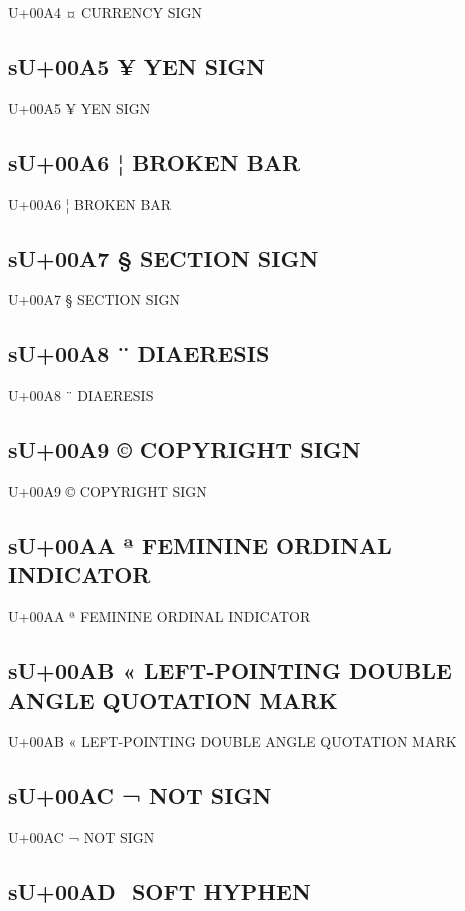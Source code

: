 U+00A4 ¤  CURRENCY SIGN

\subsection{sU+00A5 ¥  YEN SIGN}

U+00A5 ¥  YEN SIGN

\subsection{sU+00A6 ¦  BROKEN BAR}

U+00A6 ¦  BROKEN BAR

\subsection{sU+00A7 §  SECTION SIGN}

U+00A7 §  SECTION SIGN

\subsection{sU+00A8 ¨  DIAERESIS}

U+00A8 ¨  DIAERESIS

\subsection{sU+00A9 ©  COPYRIGHT SIGN}

U+00A9 ©  COPYRIGHT SIGN

\subsection{sU+00AA ª  FEMININE ORDINAL INDICATOR}

U+00AA ª  FEMININE ORDINAL INDICATOR

\subsection{sU+00AB «  LEFT-POINTING DOUBLE ANGLE QUOTATION MARK}

U+00AB «  LEFT-POINTING DOUBLE ANGLE QUOTATION MARK

\subsection{sU+00AC ¬  NOT SIGN}

U+00AC ¬  NOT SIGN

\subsection{sU+00AD ­  SOFT HYPHEN}

